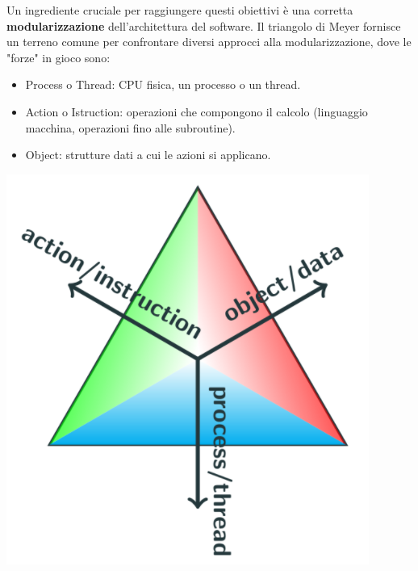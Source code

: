 Un ingrediente cruciale per raggiungere questi obiettivi è una corretta \textbf{modularizzazione} dell'architettura del software.
Il triangolo di Meyer fornisce un terreno comune per confrontare diversi approcci alla modularizzazione, dove le "forze" in gioco sono:
\begin{itemize}
    \item Process o Thread: CPU fisica, un processo o un thread.
    \item Action o Istruction: operazioni che compongono il calcolo (linguaggio macchina, operazioni fino alle subroutine).
    \item Object: strutture dati a cui le azioni si applicano.
\end{itemize}

\begin{center}
    \includegraphics[scale=0.4]{images/triangolo di meyer.PNG}
\end{center}


